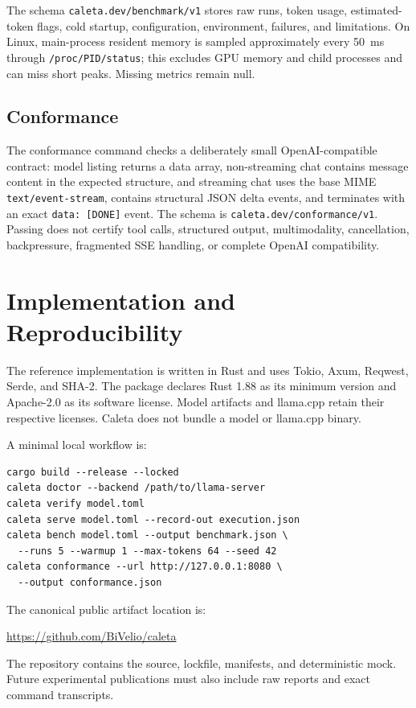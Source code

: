 \documentclass[11pt,a4paper]{article}
\newcommand{\schema}[1]{\texttt{#1}}
\begin{document}
The schema \schema{caleta.dev/benchmark/v1} stores raw runs, token usage, estimated-token flags, cold startup, configuration, environment, failures, and limitations. On Linux, main-process resident memory is sampled approximately every 50~ms through \texttt{/proc/PID/status}; this excludes GPU memory and child processes and can miss short peaks. Missing metrics remain null.

\subsection{Conformance}

The conformance command checks a deliberately small OpenAI-compatible contract: model listing returns a data array, non-streaming chat contains message content in the expected structure, and streaming chat uses the base MIME \texttt{text/event-stream}, contains structural JSON delta events, and terminates with an exact \texttt{data: [DONE]} event. The schema is \schema{caleta.dev/conformance/v1}. Passing does not certify tool calls, structured output, multimodality, cancellation, backpressure, fragmented SSE handling, or complete OpenAI compatibility.

\section{Implementation and Reproducibility}

The reference implementation is written in Rust and uses Tokio, Axum, Reqwest, Serde, and SHA-2. The package declares Rust 1.88 as its minimum version and Apache-2.0 as its software license. Model artifacts and llama.cpp retain their respective licenses. Caleta does not bundle a model or llama.cpp binary.

A minimal local workflow is:

\begin{lstlisting}
cargo build --release --locked
caleta doctor --backend /path/to/llama-server
caleta verify model.toml
caleta serve model.toml --record-out execution.json
caleta bench model.toml --output benchmark.json \
  --runs 5 --warmup 1 --max-tokens 64 --seed 42
caleta conformance --url http://127.0.0.1:8080 \
  --output conformance.json
\end{lstlisting}

The canonical public artifact location is:
\begin{center}
\url{https://github.com/BiVelio/caleta}
\end{center}
The repository contains the source, lockfile, manifests, and deterministic mock. Future experimental publications must also include raw reports and exact command transcripts.
\end{document}

